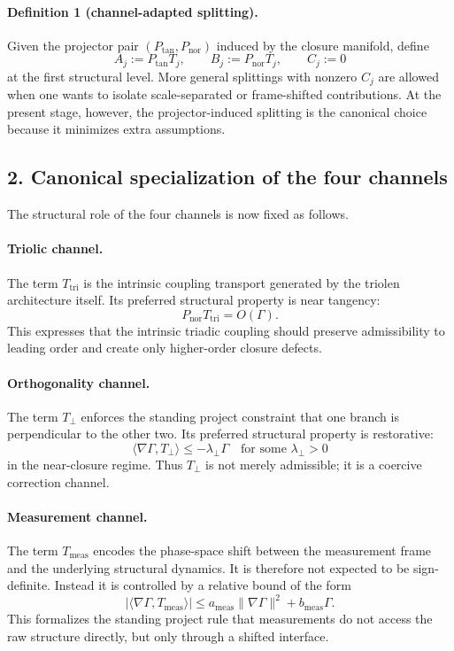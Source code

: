 \paragraph{Definition 1 (channel-adapted splitting).}
Given the projector pair $(P_{\mathrm{tan}},P_{\mathrm{nor}})$ induced by the closure
manifold, define
\[
A_j:=P_{\mathrm{tan}}T_j,
\qquad
B_j:=P_{\mathrm{nor}}T_j,
\qquad
C_j:=0
\]
at the first structural level. More general splittings with nonzero $C_j$ are
allowed when one wants to isolate scale-separated or frame-shifted contributions.
At the present stage, however, the projector-induced splitting is the canonical
choice because it minimizes extra assumptions.

\subsection*{2. Canonical specialization of the four channels}
The structural role of the four channels is now fixed as follows.

\paragraph{Triolic channel.}
The term $T_{\mathrm{tri}}$ is the intrinsic coupling transport generated by the
triolen architecture itself. Its preferred structural property is near tangency:
\[
P_{\mathrm{nor}}T_{\mathrm{tri}} = O(\Gamma).
\]
This expresses that the intrinsic triadic coupling should preserve admissibility to
leading order and create only higher-order closure defects.

\paragraph{Orthogonality channel.}
The term $T_{\perp}$ enforces the standing project constraint that one branch is
perpendicular to the other two. Its preferred structural property is restorative:
\[
\langle \nabla\Gamma, T_{\perp}\rangle \le -\lambda_{\perp}\Gamma
\quad\text{for some }\lambda_{\perp}>0
\]
in the near-closure regime. Thus $T_{\perp}$ is not merely admissible; it is a
coercive correction channel.

\paragraph{Measurement channel.}
The term $T_{\mathrm{meas}}$ encodes the phase-space shift between the measurement
frame and the underlying structural dynamics. It is therefore not expected to be
sign-definite. Instead it is controlled by a relative bound of the form
\[
|\langle \nabla\Gamma, T_{\mathrm{meas}}\rangle|
\le a_{\mathrm{meas}}\|\nabla\Gamma\|^2 + b_{\mathrm{meas}}\Gamma.
\]
This formalizes the standing project rule that measurements do not access the raw
structure directly, but only through a shifted interface.

